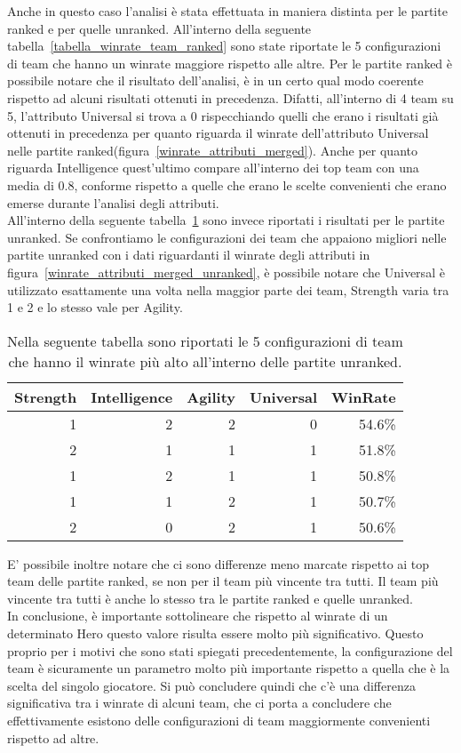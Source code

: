 Anche in questo caso l'analisi è stata effettuata in maniera distinta per le partite ranked e per quelle unranked. All'interno della seguente tabella~\ref{tabella_winrate_team_ranked} sono state riportate le 5 configurazioni di team che hanno un winrate maggiore rispetto alle altre.  Per le partite ranked è possibile notare che il risultato dell'analisi, è in un certo qual modo coerente rispetto ad alcuni risultati ottenuti in precedenza. Difatti, all'interno di 4 team su 5, l'attributo Universal si trova a 0 rispecchiando quelli che erano i risultati già ottenuti in precedenza per quanto riguarda il winrate dell'attributo Universal nelle partite ranked(figura~\ref{winrate_attributi_merged}). Anche per quanto riguarda Intelligence quest'ultimo compare all'interno dei top team con una media di 0.8, conforme rispetto a quelle che erano le scelte convenienti che erano emerse durante l'analisi degli attributi. \\
All'interno della seguente tabella~\ref{tabella_winrate_team_unranked} sono invece riportati i risultati per le partite unranked. Se confrontiamo le configurazioni dei team che appaiono migliori nelle partite unranked con i dati riguardanti il winrate degli attributi in figura~\ref{winrate_attributi_merged_unranked}, è possibile notare che Universal è utilizzato esattamente una volta nella maggior parte dei team, Strength varia tra 1 e 2 e lo stesso vale per Agility. \\
\begin{table}
\centering
\caption{Nella seguente tabella sono riportati le 5 configurazioni di team che hanno il winrate più alto all'interno delle partite unranked.}
\label{tabella_winrate_team_unranked}
\begin{tabular}{|r|r|r|r|r|}
\hline
\multicolumn{1}{|l|}{Strength} & \multicolumn{1}{l|}{Intelligence} & \multicolumn{1}{l|}{Agility} & \multicolumn{1}{l|}{Universal} & \multicolumn{1}{l|}{WinRate} \\ \hline
1 & 2 & 2 & 0 &   54.6\% \\ \hline
2 & 1 & 1 & 1 &   51.8\%  \\ \hline
1 & 2 & 1 & 1 &   50.8\% \\ \hline
1 & 1 & 2 & 1 &   50.7\%  \\ \hline
2 & 0 & 2 & 1 &   50.6\% \\ \hline
\end{tabular}
\end{table}
E' possibile inoltre notare che ci sono differenze meno marcate rispetto ai top team delle partite ranked, se non per il team più vincente tra tutti. Il team più vincente tra tutti è anche lo stesso tra le partite ranked e quelle unranked. \\
In conclusione, è importante sottolineare che rispetto al winrate di un determinato Hero questo valore risulta essere molto più significativo. Questo proprio per i motivi che sono stati spiegati precedentemente, la configurazione del team è sicuramente un parametro molto più importante rispetto a quella che è la scelta del singolo giocatore. Si può concludere quindi che c'è una differenza significativa tra i winrate di alcuni team, che ci porta a concludere che effettivamente esistono delle configurazioni di team maggiormente convenienti rispetto ad altre.